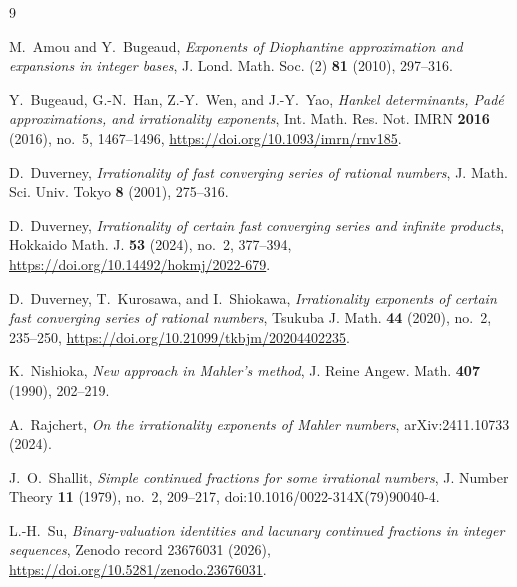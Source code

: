 \documentclass{amsart}
\numberwithin{equation}{section}
\begin{document}
\begin{thebibliography}{9}

M.~Amou and Y.~Bugeaud, \emph{Exponents of Diophantine approximation
and expansions in integer bases}, J. Lond. Math. Soc. (2)
\textbf{81} (2010), 297--316.

Y.~Bugeaud, G.-N.~Han, Z.-Y.~Wen, and J.-Y.~Yao,
\emph{Hankel determinants, Pad\'e approximations, and irrationality
exponents}, Int. Math. Res. Not. IMRN \textbf{2016} (2016), no.~5,
1467--1496, \url{https://doi.org/10.1093/imrn/rnv185}.

D.~Duverney, \emph{Irrationality of fast converging series of rational
numbers}, J. Math. Sci. Univ. Tokyo \textbf{8} (2001), 275--316.

D.~Duverney, \emph{Irrationality of certain fast converging series and
infinite products}, Hokkaido Math. J. \textbf{53} (2024), no.~2,
377--394, \url{https://doi.org/10.14492/hokmj/2022-679}.

D.~Duverney, T.~Kurosawa, and I.~Shiokawa,
\emph{Irrationality exponents of certain fast converging series of
rational numbers}, Tsukuba J. Math. \textbf{44} (2020), no.~2,
235--250, \url{https://doi.org/10.21099/tkbjm/20204402235}.

K.~Nishioka, \emph{New approach in Mahler's method},
J. Reine Angew. Math. \textbf{407} (1990), 202--219.

A.~Rajchert, \emph{On the irrationality exponents of Mahler numbers},
arXiv:2411.10733 (2024).

J.~O.~Shallit, \emph{Simple continued fractions for some irrational
numbers}, J. Number Theory \textbf{11} (1979), no.~2, 209--217,
doi:10.1016/0022-314X(79)90040-4.

L.-H.~Su, \emph{Binary-valuation identities and lacunary continued fractions
in integer sequences}, Zenodo record 23676031 (2026),
\url{https://doi.org/10.5281/zenodo.23676031}.

\end{thebibliography}
\end{document}
